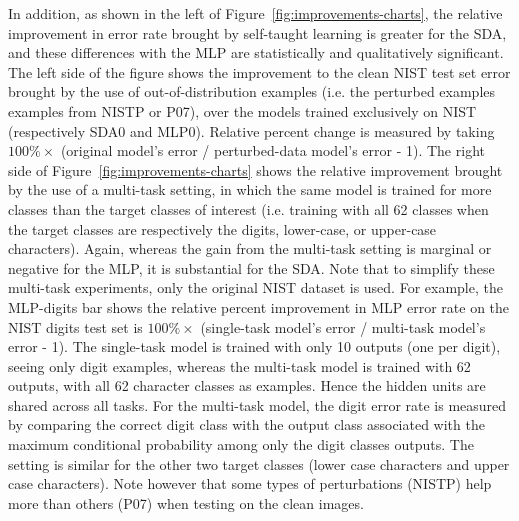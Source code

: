 \documentclass{article} %
\begin{document}
In addition, as shown in the left of
Figure~\ref{fig:improvements-charts}, the relative improvement in error
rate brought by self-taught learning is greater for the SDA, and these
differences with the MLP are statistically and qualitatively
significant. 
The left side of the figure shows the improvement to the clean
NIST test set error brought by the use of out-of-distribution examples
(i.e. the perturbed examples examples from NISTP or P07),
over the models trained exclusively on NIST (respectively SDA0 and MLP0).
Relative percent change is measured by taking
$100 \% \times$ (original model's error / perturbed-data model's error - 1).
The right side of
Figure~\ref{fig:improvements-charts} shows the relative improvement
brought by the use of a multi-task setting, in which the same model is
trained for more classes than the target classes of interest (i.e. training
with all 62 classes when the target classes are respectively the digits,
lower-case, or upper-case characters). Again, whereas the gain from the
multi-task setting is marginal or negative for the MLP, it is substantial
for the SDA.  Note that to simplify these multi-task experiments, only the original
NIST dataset is used. For example, the MLP-digits bar shows the relative
percent improvement in MLP error rate on the NIST digits test set 
is $100\% \times$ (single-task
model's error / multi-task model's error - 1).  The single-task model is
trained with only 10 outputs (one per digit), seeing only digit examples,
whereas the multi-task model is trained with 62 outputs, with all 62
character classes as examples.  Hence the hidden units are shared across
all tasks.  For the multi-task model, the digit error rate is measured by
comparing the correct digit class with the output class associated with the
maximum conditional probability among only the digit classes outputs.  The
setting is similar for the other two target classes (lower case characters
and upper case characters). Note however that some types of perturbations
(NISTP) help more than others (P07) when testing on the clean images.

\end{document}
